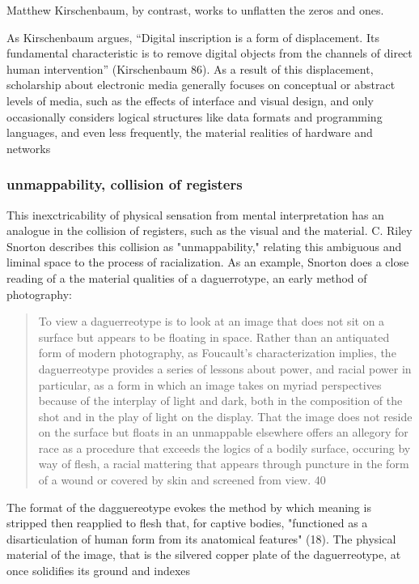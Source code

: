 \documentclass[11pt]{article}
\begin{document}
Matthew Kirschenbaum, by contrast, works to unflatten the zeros and
ones. 

As Kirschenbaum argues, “Digital inscription is a form of
displacement. Its fundamental characteristic is to remove digital
objects from the channels of direct human intervention” (Kirschenbaum
86). As a result of this displacement, scholarship about electronic
media generally focuses on conceptual or abstract levels of media,
such as the effects of interface and visual design, and only
occasionally considers logical structures like data formats and
programming languages, and even less frequently, the material
realities of hardware and networks




\subsubsection{unmappability, collision of registers}
\label{sec:org690564c}
This inexctricability of physical sensation from mental interpretation
has an analogue in the collision of registers, such as the visual and
the material. C. Riley Snorton describes this collision as
"unmappability," relating this ambiguous and liminal space to the
process of racialization. As an example, Snorton does a close reading
of a the material qualities of a daguerrotype, an early method of
photography:
\begin{quote}
To view a daguerreotype is to look at an image that does not sit on a
surface but appears to be floating in space. Rather than an antiquated
form of modern photography, as Foucault’s characterization implies,
the daguerreotype provides a series of lessons about power, and racial
power in particular, as a form in which an image takes on myriad
perspectives because of the interplay of light and dark, both in the
composition of the shot and in the play of light on the display. That
the image does not reside on the surface but floats in an unmappable
elsewhere offers an allegory for race as a procedure that exceeds the
logics of a bodily surface, occuring by way of flesh, a racial
mattering that appears through puncture in the form of a wound or
covered by skin and screened from view. 40
\end{quote}
The format of the dagguereotype evokes the method by which meaning is
stripped then reapplied to flesh that, for captive bodies, "functioned
as a disarticulation of human form from its anatomical features"
(18). The physical material of the image, that is the silvered copper
plate of the daguerreotype, at once solidifies its ground and indexes
\end{document}
